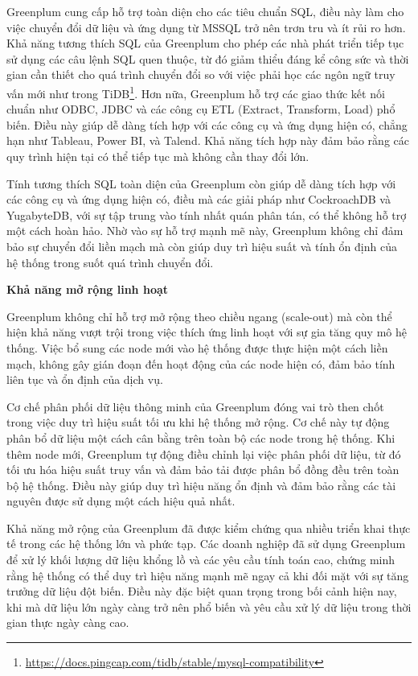 \documentclass{article}[14pt]
\begin{document}
Greenplum cung cấp hỗ trợ toàn diện cho các tiêu chuẩn SQL, điều này làm cho việc chuyển đổi dữ liệu và ứng dụng từ MSSQL trở nên trơn tru và ít rủi ro hơn. Khả năng tương thích SQL của Greenplum cho phép các nhà phát triển tiếp tục sử dụng các câu lệnh SQL quen thuộc, từ đó giảm thiểu đáng kể công sức và thời gian cần thiết cho quá trình chuyển đổi so với việc phải học các ngôn ngữ truy vấn mới như trong TiDB\footnote{\url{https://docs.pingcap.com/tidb/stable/mysql-compatibility}}. Hơn nữa, Greenplum hỗ trợ các giao thức kết nối chuẩn như ODBC, JDBC và các công cụ ETL (Extract, Transform, Load) phổ biến. Điều này giúp dễ dàng tích hợp với các công cụ và ứng dụng hiện có, chẳng hạn như Tableau, Power BI, và Talend. Khả năng tích hợp này đảm bảo rằng các quy trình hiện tại có thể tiếp tục mà không cần thay đổi lớn.

Tính tương thích SQL toàn diện của Greenplum còn giúp dễ dàng tích hợp với các công cụ và ứng dụng hiện có, điều mà các giải pháp như CockroachDB và YugabyteDB, với sự tập trung vào tính nhất quán phân tán, có thể không hỗ trợ một cách hoàn hảo. Nhờ vào sự hỗ trợ mạnh mẽ này, Greenplum không chỉ đảm bảo sự chuyển đổi liền mạch mà còn giúp duy trì hiệu suất và tính ổn định của hệ thống trong suốt quá trình chuyển đổi.


\textbf{Khả năng mở rộng linh hoạt}

Greenplum không chỉ hỗ trợ mở rộng theo chiều ngang (scale-out) mà còn thể hiện khả năng vượt trội trong việc thích ứng linh hoạt với sự gia tăng quy mô hệ thống. Việc bổ sung các node mới vào hệ thống được thực hiện một cách liền mạch, không gây gián đoạn đến hoạt động của các node hiện có, đảm bảo tính liên tục và ổn định của dịch vụ.

Cơ chế phân phối dữ liệu thông minh của Greenplum đóng vai trò then chốt trong việc duy trì hiệu suất tối ưu khi hệ thống mở rộng. Cơ chế này tự động phân bổ dữ liệu một cách cân bằng trên toàn bộ các node trong hệ thống. Khi thêm node mới, Greenplum tự động điều chỉnh lại việc phân phối dữ liệu, từ đó tối ưu hóa hiệu suất truy vấn và đảm bảo tải được phân bổ đồng đều trên toàn bộ hệ thống. Điều này giúp duy trì hiệu năng ổn định và đảm bảo rằng các tài nguyên được sử dụng một cách hiệu quả nhất.

Khả năng mở rộng của Greenplum đã được kiểm chứng qua nhiều triển khai thực tế trong các hệ thống lớn và phức tạp. Các doanh nghiệp đã sử dụng Greenplum để xử lý khối lượng dữ liệu khổng lồ và các yêu cầu tính toán cao, chứng minh rằng hệ thống có thể duy trì hiệu năng mạnh mẽ ngay cả khi đối mặt với sự tăng trưởng dữ liệu đột biến. Điều này đặc biệt quan trọng trong bối cảnh hiện nay, khi mà dữ liệu lớn ngày càng trở nên phổ biến và yêu cầu xử lý dữ liệu trong thời gian thực ngày càng cao.
\end{document}
